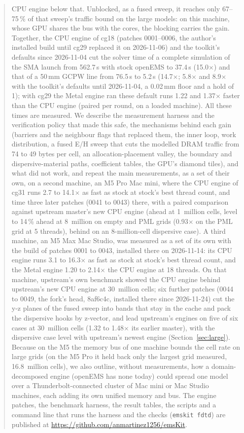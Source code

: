\documentclass[10pt,a4paper]{article}
\newcommand{\code}[1]{\texttt{\small #1}}
\newcommand{\repourl}{\url{https://github.com/anmartinez1256/emsKit}}   %
\begin{document}
\begin{abstract}
CPU engine below that. Unblocked, as a fused sweep, it reaches only 67--75\,\% of that sweep's traffic bound on the large
models: on this machine, whose GPU shares the bus with the cores, the blocking carries the gain. Together, the CPU
engine of cg18 (patches 0001--0006, the author's installed build until cg29 replaced it on 2026-11-06) and the
toolkit's defaults since 2026-11-04 cut the solver
time of a complete simulation of the SMA launch from 562.7\,s with stock openEMS to 37.4\,s (15.0$\times$) and that of a
50\,mm GCPW line from 76.5\,s to 5.2\,s (14.7$\times$; 5.8$\times$ and 8.9$\times$ with the toolkit's defaults until
2026-11-04, a 0.02\,mm floor and a hold of 1); with cg29 the Metal engine ran these default runs 1.22 and 1.37$\times$
faster than the CPU engine
(paired per round, on a loaded machine). All these times are measured. We describe the measurement harness and the
verification policy that made this safe, the mechanisms behind each gain (barriers and the neighbour flags that
replaced them, the inner loop, work distribution, a fused E/H sweep that cuts the modelled DRAM traffic from 74 to 49
bytes per cell, an allocation-placement valley, the boundary and dispersive-material paths, coefficient tables, the
GPU's diamond tiles), and what did not work, and repeat the main measurements, as a set of their own, on a second
machine, an M5 Pro Mac mini, where the CPU engine of cg31 runs 2.7 to 14.1$\times$ as fast as stock at stock's best thread
count, and time three later patches (0041 to 0043) there, with a paired comparison against upstream master's new CPU engine
(ahead at 1~million cells, level to 14\,\% ahead at 8~million on empty and PML grids (0.93$\times$ on the PML grid at 5 threads), behind on an 8-million-cell dispersive case). A third machine, an M5 Max Mac Studio, was measured as a set of its own with the build of patches 0001 to 0043, installed there on 2026-11-14: its CPU engine runs 3.1 to 16.3$\times$ as fast as stock at stock's best thread count, and the Metal engine 1.20 to 2.14$\times$ the CPU engine at 18 threads. On that machine, upstream's own benchmark showed the CPU engine behind upstream's new CPU engine at 30~million cells; six further patches (0044 to 0049, the fork's head, 8af6c4c, installed there since 2026-11-24) cut the y-z planes of the fused sweep into bands that stay in the cache and pack the dispersive hooks by z-vector, and lead upstream's engines on five of six cases at 30~million cells (1.32 to 1.48$\times$ its earlier master), with the dispersive case level with upstream's newest engine (Section~\ref{sec:large}). Because on the M5 the memory bus of one machine bounds the cell rate on large grids (on the M5 Pro it held back only the largest grid
measured, 16.8~million cells), we also
outline, without measurements, how a domain-decomposed engine (openEMS has none today) could spread one model over a
Thunderbolt-connected cluster of Mac mini or Mac Studio machines, each adding its own unified memory and bus. The
engine patches, the benchmark harness, the result tables, the scripts and a command line that runs the harness and
the checks (\code{emskit fdtd}) are published at \repourl.
\end{abstract}
\end{document}
